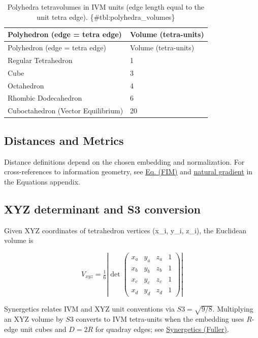 \documentclass[
]{article}
\begin{document}
\begin{longtable}[]{@{}ll@{}}
\caption{Polyhedra tetravolumes in IVM units (edge length equal to the
unit tetra edge). \{\#tbl:polyhedra\_volumes\}}\tabularnewline
\toprule
Polyhedron (edge = tetra edge) & Volume (tetra-units)\tabularnewline
\midrule
\endfirsthead
\toprule
Polyhedron (edge = tetra edge) & Volume (tetra-units)\tabularnewline
\midrule
\endhead
Regular Tetrahedron & 1\tabularnewline
Cube & 3\tabularnewline
Octahedron & 4\tabularnewline
Rhombic Dodecahedron & 6\tabularnewline
Cuboctahedron (Vector Equilibrium) & 20\tabularnewline
\bottomrule
\end{longtable}

\hypertarget{distances-and-metrics}{%
\subsection{Distances and Metrics}\label{distances-and-metrics}}

Distance definitions depend on the chosen embedding and normalization.
For cross-references to information geometry, see
\href{08_equations_appendix.md\#eq:fim}{Eq. (FIM)} and
\href{08_equations_appendix.md\#eq:natgrad}{natural gradient} in the
Equations appendix.

\hypertarget{sec:xyz_conversion}{%
\subsection{XYZ determinant and S3
conversion}\label{sec:xyz_conversion}}

Given XYZ coordinates of tetrahedron vertices (x\_i, y\_i, z\_i), the
Euclidean volume is

\begin{equation}\label{eq:xyz_det}
V_{xyz} = \tfrac{1}{6} \left| \det \begin{pmatrix}
 x_a & y_a & z_a & 1 \\
 x_b & y_b & z_b & 1 \\
 x_c & y_c & z_c & 1 \\
 x_d & y_d & z_d & 1
\end{pmatrix} \right|
\end{equation}

Synergetics relates IVM and XYZ unit conventions via
\(S3 = \sqrt{9/8}\). Multiplying an XYZ volume by \(S3\) converts to IVM
tetra-units when the embedding uses \(R\)-edge unit cubes and \(D=2R\)
for quadray edges; see
\href{https://en.wikipedia.org/wiki/Synergetics_(Fuller)}{Synergetics
(Fuller)}.
\end{document}
